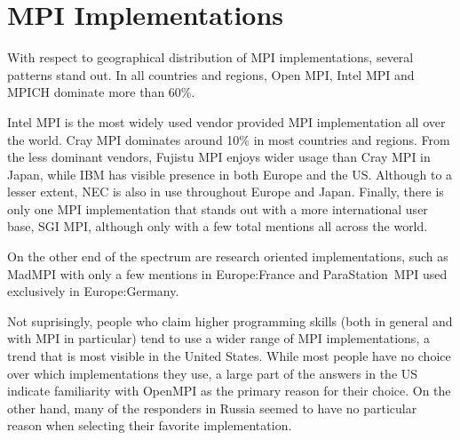 \section{MPI Implementations}
\label{sec:disc:impl}

With respect to geographical distribution of MPI implementations, several
patterns stand out. In all countries and regions, Open MPI, Intel MPI and MPICH
dominate more than 60\%.

Intel MPI is the most widely used vendor provided MPI implementation all over
the world.  Cray MPI dominates around 10\% in most countries and regions.  From
the less dominant vendors, Fujistu MPI enjoys wider usage than Cray MPI in
Japan, while IBM has visible presence in both Europe and the US.  Although to a
lesser extent, NEC is also in use throughout Europe and Japan.  Finally, there
is only one MPI implementation that stands out with a more international user
base, SGI MPI, although only with a few total mentions all across the world.

On the other end of the spectrum are research oriented implementations, such as
MadMPI with only a few mentions in Europe:France and ParaStation~MPI used
exclusively in Europe:Germany.

Not suprisingly, people who claim higher programming skills (both in general
and with MPI in particular) tend to use a wider range of MPI implementations, a
trend that is most visible in the United States. While most people have no
choice over which implementations they use, a large part of the answers in the
US indicate familiarity with OpenMPI as the primary reason for their choice. On
the other hand, many of the responders in Russia seemed to have no particular
reason when selecting their favorite implementation.



